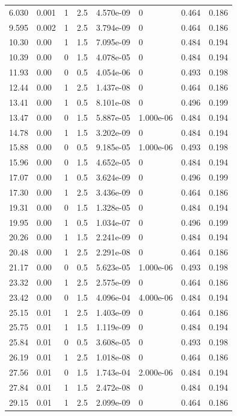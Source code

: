 \documentclass[preview]{standalone}
\begin{document}
{{\begin{tabular}{L{1.2cm}C{1.2cm} C{0.3cm}C{0.5cm} C{1.4cm}C{1.4cm} C{1.4cm}C{1.4cm}}
  6.030  &  0.001  & 1     & 2.5 &  4.570e-09  & 0  & 0.464 &  0.186   \\ 
  9.595  &  0.002  & 1     & 2.5 &  3.794e-09  & 0  & 0.464 &  0.186   \\ 
  10.30  &  0.00  & 1     & 1.5 &  7.095e-09  & 0  & 0.484 &  0.194   \\ 
  10.39  &  0.00  & 0     & 1.5 &  4.078e-05  & 0  & 0.484 &  0.194   \\ 
  11.93  &  0.00  & 0     & 0.5 &  4.054e-06  & 0  & 0.493 &  0.198   \\ 
  12.44  &  0.00  & 1     & 2.5 &  1.437e-08  & 0  & 0.464 &  0.186   \\ 
  13.41  &  0.00  & 1     & 0.5 &  8.101e-08  & 0  & 0.496 &  0.199   \\ 
  13.47  &  0.00  & 0     & 1.5 &  5.887e-05  & 1.000e-06  & 0.484 &  0.194   \\ 
  14.78  &  0.00  & 1     & 1.5 &  3.202e-09  & 0  & 0.484 &  0.194   \\ 
  15.88  &  0.00  & 0     & 0.5 &  9.185e-05  & 1.000e-06  & 0.493 &  0.198   \\ 
  15.96  &  0.00  & 0     & 1.5 &  4.652e-05  & 0  & 0.484 &  0.194   \\ 
  17.07  &  0.00  & 1     & 0.5 &  3.624e-09  & 0  & 0.496 &  0.199   \\ 
  17.30  &  0.00  & 1     & 2.5 &  3.436e-09  & 0  & 0.464 &  0.186   \\ 
  19.31  &  0.00  & 0     & 1.5 &  1.328e-05  & 0  & 0.484 &  0.194   \\ 
  19.95  &  0.00  & 1     & 0.5 &  1.034e-07  & 0  & 0.496 &  0.199   \\ 
  20.26  &  0.00  & 1     & 1.5 &  2.241e-09  & 0  & 0.484 &  0.194   \\ 
  20.48  &  0.00  & 1     & 2.5 &  2.291e-08  & 0  & 0.464 &  0.186   \\ 
  21.17  &  0.00  & 0     & 0.5 &  5.623e-05  & 1.000e-06  & 0.493 &  0.198   \\ 
  23.32  &  0.00  & 1     & 2.5 &  2.575e-09  & 0  & 0.464 &  0.186   \\ 
  23.42  &  0.00  & 0     & 1.5 &  4.096e-04  & 4.000e-06  & 0.484 &  0.194   \\ 
  25.15  &  0.01  & 1     & 2.5 &  1.403e-09  & 0  & 0.464 &  0.186   \\ 
  25.75  &  0.01  & 1     & 1.5 &  1.119e-09  & 0  & 0.484 &  0.194   \\ 
  25.84  &  0.01  & 0     & 0.5 &  3.608e-05  & 0  & 0.493 &  0.198   \\ 
  26.19  &  0.01  & 1     & 2.5 &  1.018e-08  & 0  & 0.464 &  0.186   \\ 
  27.56  &  0.01  & 0     & 1.5 &  1.743e-04  & 2.000e-06  & 0.484 &  0.194   \\ 
  27.84  &  0.01  & 1     & 1.5 &  2.472e-08  & 0  & 0.484 &  0.194   \\ 
  29.15  &  0.01  & 1     & 2.5 &  2.099e-09  & 0  & 0.464 &  0.186   \\ 
\hline 
\end{tabular} 

}}
\end{document}
